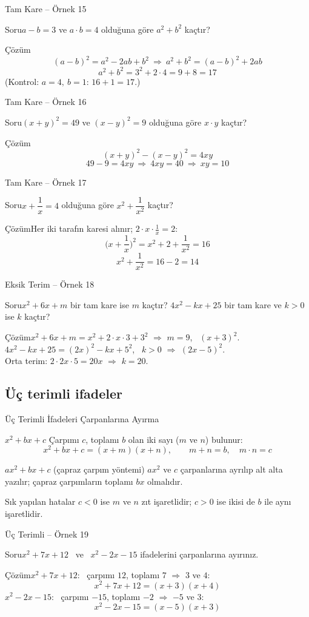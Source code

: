 \documentclass[aspectratio=169,11pt,handout]{beamer}
\newcommand{\soru}[3]{%
\begin{frame}{#1}
  \begin{block}{Soru}\large #2\end{block}
  \pause
  \begin{exampleblock}{Çözüm}\large #3\end{exampleblock}
\end{frame}}
\begin{document}
\soru{Tam Kare -- Örnek 15}
{\(a-b=3\) ve \(a\cdot b=4\) olduğuna göre \(a^2+b^2\) kaçtır?}
{\[(a-b)^2=a^2-2ab+b^2\ \Rightarrow\ a^2+b^2=(a-b)^2+2ab\]
\[a^2+b^2=3^2+2\cdot 4=9+8=17\]
(Kontrol: \(a=4,\ b=1\): \(16+1=17\).)}

\soru{Tam Kare -- Örnek 16}
{\((x+y)^2=49\) ve \((x-y)^2=9\) olduğuna göre \(x\cdot y\) kaçtır?}
{\[(x+y)^2-(x-y)^2=4xy\]
\[49-9=4xy\ \Rightarrow\ 4xy=40\ \Rightarrow\ xy=10\]}

\soru{Tam Kare -- Örnek 17}
{\(x+\dfrac{1}{x}=4\) olduğuna göre \(x^2+\dfrac{1}{x^2}\) kaçtır?}
{Her iki tarafın karesi alınır; \(2\cdot x\cdot\frac{1}{x}=2\):
\[\Big(x+\frac{1}{x}\Big)^2=x^2+2+\frac{1}{x^2}=16\]
\[x^2+\frac{1}{x^2}=16-2=14\]}

\soru{Eksik Terim -- Örnek 18}
{\(x^2+6x+m\) bir tam kare ise \(m\) kaçtır? \(4x^2-kx+25\) bir tam kare ve \(k>0\) ise \(k\) kaçtır?}
{\(x^2+6x+m=x^2+2\cdot x\cdot 3+3^2\) \(\Rightarrow\) \(m=9\), \ \((x+3)^2\).\\[4pt]
\(4x^2-kx+25=(2x)^2-kx+5^2\), \ \(k>0\) \(\Rightarrow\) \((2x-5)^2\).\\[3pt]
Orta terim: \(2\cdot 2x\cdot 5=20x\) \(\Rightarrow\) \(k=20\).}

\subsection{Üç terimli ifadeler}
\begin{frame}{Üç Terimli İfadeleri Çarpanlarına Ayırma}
\begin{block}{\(x^2+bx+c\)}
Çarpımı \(c\), toplamı \(b\) olan iki sayı (\(m\) ve \(n\)) bulunur:
\[x^2+bx+c=(x+m)(x+n),\qquad m+n=b,\quad m\cdot n=c\]
\end{block}
\begin{block}{\(ax^2+bx+c\) (çapraz çarpım yöntemi)}
\(ax^2\) ve \(c\) çarpanlarına ayrılıp alt alta yazılır; çapraz çarpımların toplamı \(bx\) olmalıdır.
\end{block}
\begin{alertblock}{Sık yapılan hatalar}
\(c<0\) ise \(m\) ve \(n\) zıt işaretlidir; \(c>0\) ise ikisi de \(b\) ile aynı işaretlidir.
\end{alertblock}
\end{frame}

\soru{Üç Terimli -- Örnek 19}
{\(x^2+7x+12\) \ ve \ \(x^2-2x-15\) ifadelerini çarpanlarına ayırınız.}
{\(x^2+7x+12\): \ çarpımı \(12\), toplamı \(7\) \(\Rightarrow\) \(3\) ve \(4\):
\[x^2+7x+12=(x+3)(x+4)\]
\(x^2-2x-15\): \ çarpımı \(-15\), toplamı \(-2\) \(\Rightarrow\) \(-5\) ve \(3\):
\[x^2-2x-15=(x-5)(x+3)\]}
\end{document}
